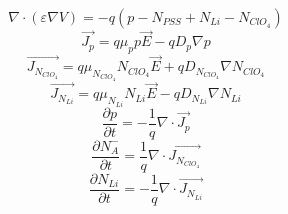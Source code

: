 \begin{doublespace}
\begin{equation}
\nabla \cdot  (\varepsilon \nabla V)=-q( p-N_{PSS}+ N_{Li} - N_{ClO_{4}})
\end{equation}
\begin{equation}
\vec{J_p}=q\mu_p p \vec{E}-q D_p \nabla p
\end{equation}
\begin{equation}
\vec{J_{N_{ClO_{4}}}}=q\mu_{N_{ClO_{4}}} N_{ClO_{4}} \vec{E}+q D_{N_{ClO_{4}}} \nabla N_{ClO_{4}}
\end{equation}
\begin{equation}
\vec{J_{N_{Li}}}=q\mu_{N_{Li}} N_{Li} \vec{E}-q D_{N_{Li}} \nabla N_{Li}
\end{equation}
\begin{equation}
\frac{\partial p}{\partial t}=-\frac{1}{q}\nabla \cdot \vec{J_p}
\end{equation}
\begin{equation}
\frac{\partial N_{A}^{-}}{\partial t}=\frac{1}{q}\nabla \cdot \vec{J_{N_{ClO_{4}}}}
\end{equation}
\begin{equation}
\frac{\partial N_{Li}}{\partial t}=-\frac{1}{q}\nabla \cdot \vec{J_{N_{Li}}}
\end{equation}



\end{doublespace}
